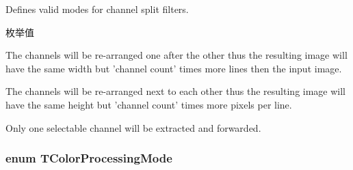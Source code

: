 Defines valid modes for channel split filters. 

\begin{Desc}
\item[枚举值]\par
\begin{description}
\item[{\em 
\hypertarget{group___common_interface_ggae8e9f7bb0e510d844b2681642e8e46d2a2a420e411cb45310319bef8b1c59083b}{csm\+Vertical}\label{group___common_interface_ggae8e9f7bb0e510d844b2681642e8e46d2a2a420e411cb45310319bef8b1c59083b}
}]The channels will be re-\/arranged one after the other thus the resulting image will have the same width but 'channel count' times more lines then the input image. \item[{\em 
\hypertarget{group___common_interface_ggae8e9f7bb0e510d844b2681642e8e46d2ab0187cc76bba95e6901e536a740490e0}{csm\+Horizontal}\label{group___common_interface_ggae8e9f7bb0e510d844b2681642e8e46d2ab0187cc76bba95e6901e536a740490e0}
}]The channels will be re-\/arranged next to each other thus the resulting image will have the same height but 'channel count' times more pixels per line. \item[{\em 
\hypertarget{group___common_interface_ggae8e9f7bb0e510d844b2681642e8e46d2a5fcafc03761898f506f014ed8da9b626}{csm\+Extract\+Single}\label{group___common_interface_ggae8e9f7bb0e510d844b2681642e8e46d2a5fcafc03761898f506f014ed8da9b626}
}]Only one selectable channel will be extracted and forwarded. \end{description}
\end{Desc}
\hypertarget{group___common_interface_ga906258e7f7e29527fd5edf23f03a7adb}{
\subsubsection[{T\+Color\+Processing\+Mode}]{\setlength{\rightskip}{0pt plus 5cm}enum {\bf T\+Color\+Processing\+Mode}}}\label{group___common_interface_ga906258e7f7e29527fd5edf23f03a7adb}


